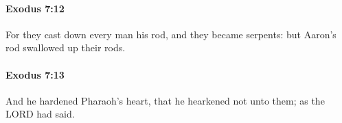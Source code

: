 		\paragraph{Exodus 7:12} %
			\label{EXODUS-7-12}

			For they cast down every man his rod, and they became serpents: but Aaron's rod swallowed up their rods.


		\paragraph{Exodus 7:13} %
			\label{EXODUS-7-13}

			And he hardened Pharaoh's heart, that he hearkened not unto them; as the LORD had said.


